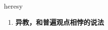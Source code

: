 
\begin{frame}
{\huge heresy}
\begin{center}
\begin{enumerate}\Large
  \item \textbf{异教，和普遍观点相悖的说法}
\end{enumerate}
\end{center}
\end{frame}
